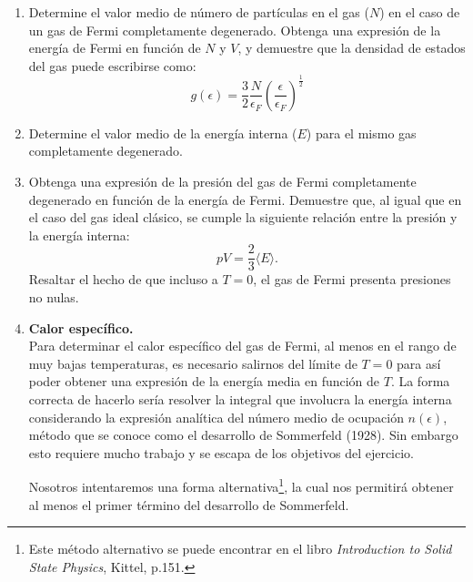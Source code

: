 \documentclass[a4paper,11pt]{article}
\begin{document}
\begin{enumerate}[label=(\alph*),
                  leftmargin=2\parindent,
                  rightmargin=2\parindent]
    
    \item{Determine el valor medio de número de partículas en el gas 
          ($N$) en el caso de un gas de Fermi completamente degenerado.
          Obtenga una expresión de la energía de Fermi en función de 
          $N$ y $V$, y demuestre que la densidad de estados del gas 
          puede escribirse como:
          $$
          g(\epsilon) =
            \frac{3}{2} \frac{N}{\epsilon_F} \left( 
            \frac{\epsilon}{\epsilon_F} \right)^{\frac{1}{2}}
          $$
          }

    \item{Determine el valor medio de la energía interna ($E$) para el 
          mismo gas completamente degenerado.
          }
    
    \item{Obtenga una expresión de la presión del gas de Fermi completamente 
          degenerado en función de la energía de Fermi.
          Demuestre que, al igual que en el caso del gas ideal 
          clásico, se cumple la siguiente relación entre la presión 
          y la energía interna:
          $$ pV = \frac{2}{3} \langle E \rangle. $$
          Resaltar el hecho de que incluso a $T = 0$, el gas 
          de Fermi presenta presiones no nulas.
          }

    \item{\textbf{Calor específico.}\\
          Para determinar el calor específico del gas de Fermi, al 
          menos en el rango de muy bajas temperaturas, es necesario 
          salirnos del límite de $T = 0$ para así poder obtener una 
          expresión de la energía media en función de $T$.
          La forma correcta de hacerlo sería resolver la integral que 
          involucra la energía interna considerando la expresión analítica 
          del número medio de ocupación $n(\epsilon)$, método que se 
          conoce como el desarrollo de Sommerfeld (1928).
          Sin embargo esto requiere mucho trabajo y se escapa de los 
          objetivos del ejercicio.

          Nosotros intentaremos una forma alternativa\footnote{Este 
          método alternativo se puede encontrar en el libro 
          \emph{Introduction to Solid State Physics}, Kittel, p.151.}, 
          la cual nos permitirá obtener al menos el primer término del 
          desarrollo de Sommerfeld.
          
}
\end{enumerate}
\end{document}
